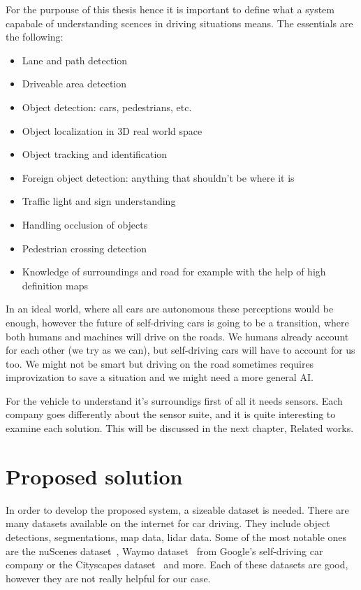 For the purpouse of this thesis hence it is important to define what a system
capabale of understanding scences in driving situations means. The essentials
are the following:
\begin{itemize}
    \item Lane  and path detection
    \item Driveable area detection
    \item Object detection: cars, pedestrians, etc.
    \item Object localization in 3D real world space
    \item Object tracking and identification
    \item Foreign object detection: anything that shouldn't be where it is
    \item Traffic light and sign understanding
    \item Handling occlusion of objects
    \item Pedestrian crossing detection
    \item Knowledge of surroundings and road for example with the help of high
          definition maps
\end{itemize}

In an ideal world, where all cars are autonomous these perceptions would be
enough, however the future of self-driving cars is going to be a transition,
where both humans and machines will drive on the roads. We humans already
account for each other (we try as we can), but self-driving cars will have to
account for us too. We might not be smart but driving on the road sometimes
requires improvization to save a situation and we might need a more general AI.

For the vehicle to understand it's surroundigs first of all it needs sensors.
Each company goes differently about the sensor suite, and it is quite
interesting to examine each solution. This will be discussed in the next
chapter, Related works.

\section{Proposed solution}

In order to develop the proposed system, a sizeable dataset is needed. There are
many datasets available on the internet for car driving. They include object
detections, segmentations, map data, lidar data. Some of the most notable ones
are the nuScenes dataset~\cite{DBLP:journals/corr/abs-1903-11027}, Waymo
dataset~\cite{sun2019scalability} from Google's self-driving car company or the
Cityscapes dataset~\cite{Cordts2016Cityscapes} and more. Each of these datasets are
good, however they are not really helpful for our case.

